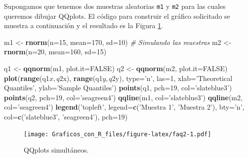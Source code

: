 \documentclass[10pt,]{krantz}
\makeatletter
\newenvironment{Shaded}{\begin{snugshade}}{\end{snugshade}}
\newcommand{\KeywordTok}[1]{\textcolor[rgb]{0.13,0.29,0.53}{\textbf{{#1}}}}
\newcommand{\DataTypeTok}[1]{\textcolor[rgb]{0.13,0.29,0.53}{{#1}}}
\newcommand{\DecValTok}[1]{\textcolor[rgb]{0.00,0.00,0.81}{{#1}}}
\newcommand{\StringTok}[1]{\textcolor[rgb]{0.31,0.60,0.02}{{#1}}}
\newcommand{\CommentTok}[1]{\textcolor[rgb]{0.56,0.35,0.01}{\textit{{#1}}}}
\newcommand{\OtherTok}[1]{\textcolor[rgb]{0.56,0.35,0.01}{{#1}}}
\newcommand{\NormalTok}[1]{{#1}}
\newenvironment{kframe}{%
\medskip{}
\setlength{\fboxsep}{.8em}
 \def\at@end@of@kframe{}%
 \ifinner\ifhmode%
  \def\at@end@of@kframe{\end{minipage}}%
  \begin{minipage}{\columnwidth}%
 \fi\fi%
 \def\FrameCommand##1{\hskip\@totalleftmargin \hskip-\fboxsep
 \colorbox{shadecolor}{##1}\hskip-\fboxsep
     \hskip-\linewidth \hskip-\@totalleftmargin \hskip\columnwidth}%
 \MakeFramed {\advance\hsize-\width
   \@totalleftmargin\z@ \linewidth\hsize
   \@setminipage}}%
 {\par\unskip\endMakeFramed%
 \at@end@of@kframe}
\renewenvironment{Shaded}{\begin{kframe}}{\end{kframe}}
\makeatother
\begin{document}
Supongamos que tenemos dos muestras aleatorias \texttt{m1} y \texttt{m2}
para las cuales queremos dibujar QQplots. El código para construir el
gráfico solicitado se muestra a continuación y el resultado es la Figura
\ref{fig:faq2}.

\begin{Shaded}
\begin{Highlighting}[]
\NormalTok{m1 <-}\StringTok{ }\KeywordTok{rnorm}\NormalTok{(}\DataTypeTok{n=}\DecValTok{15}\NormalTok{, }\DataTypeTok{mean=}\DecValTok{170}\NormalTok{, }\DataTypeTok{sd=}\DecValTok{10}\NormalTok{)  }\CommentTok{# Simulando las muestras}
\NormalTok{m2 <-}\StringTok{ }\KeywordTok{rnorm}\NormalTok{(}\DataTypeTok{n=}\DecValTok{20}\NormalTok{, }\DataTypeTok{mean=}\DecValTok{160}\NormalTok{, }\DataTypeTok{sd=}\DecValTok{15}\NormalTok{)}

\NormalTok{q1 <-}\StringTok{ }\KeywordTok{qqnorm}\NormalTok{(m1, }\DataTypeTok{plot.it=}\OtherTok{FALSE}\NormalTok{)}
\NormalTok{q2 <-}\StringTok{ }\KeywordTok{qqnorm}\NormalTok{(m2, }\DataTypeTok{plot.it=}\OtherTok{FALSE}\NormalTok{)}
\KeywordTok{plot}\NormalTok{(}\KeywordTok{range}\NormalTok{(q1$x, q2$x), }\KeywordTok{range}\NormalTok{(q1$y, q2$y), }\DataTypeTok{type=}\StringTok{'n'}\NormalTok{, }\DataTypeTok{las=}\DecValTok{1}\NormalTok{,}
     \DataTypeTok{xlab=}\StringTok{'Theoretical Quantiles'}\NormalTok{, }\DataTypeTok{ylab=}\StringTok{'Sample Quantiles'}\NormalTok{)}
\KeywordTok{points}\NormalTok{(q1, }\DataTypeTok{pch=}\DecValTok{19}\NormalTok{, }\DataTypeTok{col=}\StringTok{'slateblue3'}\NormalTok{)}
\KeywordTok{points}\NormalTok{(q2, }\DataTypeTok{pch=}\DecValTok{19}\NormalTok{, }\DataTypeTok{col=}\StringTok{'seagreen4'}\NormalTok{)}
\KeywordTok{qqline}\NormalTok{(m1, }\DataTypeTok{col=}\StringTok{'slateblue3'}\NormalTok{)}
\KeywordTok{qqline}\NormalTok{(m2, }\DataTypeTok{col=}\StringTok{'seagreen4'}\NormalTok{)}
\KeywordTok{legend}\NormalTok{(}\StringTok{'topleft'}\NormalTok{, }\DataTypeTok{legend=}\KeywordTok{c}\NormalTok{(}\StringTok{'Muestra 1'}\NormalTok{, }\StringTok{'Muestra 2'}\NormalTok{), }\DataTypeTok{bty=}\StringTok{'n'}\NormalTok{,}
       \DataTypeTok{col=}\KeywordTok{c}\NormalTok{(}\StringTok{'slateblue3'}\NormalTok{, }\StringTok{'seagreen4'}\NormalTok{), }\DataTypeTok{pch=}\DecValTok{19}\NormalTok{)}
\end{Highlighting}
\end{Shaded}

\begin{figure}[htbp]
\centering
\texttt{[image: Graficos\_con\_R\_files/figure-latex/faq2-1.pdf]}
\caption{\label{fig:faq2}QQplots simultáneos.}
\end{figure}
\end{document}
